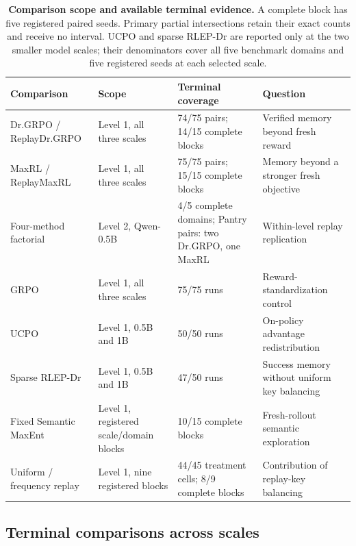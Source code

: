 \documentclass{article}
\newcommand{\1}{\mathbf 1}
\theoremstyle{remark}
\theoremstyle{definition}
\theoremstyle{plain}
\begin{document}
\begin{table}[H]
  \centering
  \caption{\textbf{Comparison scope and available terminal evidence.}
  A complete block has five registered paired seeds. Primary partial
  intersections retain their exact counts and receive no interval.
  UCPO and sparse RLEP-Dr are reported only at the two smaller model scales;
  their denominators cover all five benchmark domains and five registered
  seeds at each selected scale.}
  \label{tab:experiment-map}
  \label{tab:direct-comparators}
  \scriptsize
  \setlength{\tabcolsep}{3pt}
  \begin{tabularx}{\linewidth}{@{}P{.24\linewidth}P{.20\linewidth}P{.22\linewidth}Y@{}}
    \toprule
    \textbf{Comparison} & \textbf{Scope} & \textbf{Terminal coverage}
      & \textbf{Question} \\
    \midrule
    Dr.GRPO / ReplayDr.GRPO & Level 1, all three scales &
      74/75 pairs; 14/15 complete blocks & Verified memory beyond fresh reward \\
    MaxRL / ReplayMaxRL & Level 1, all three scales &
      75/75 pairs; 15/15 complete blocks & Memory beyond a stronger fresh objective \\
    Four-method factorial & Level 2, Qwen-0.5B &
      4/5 complete domains; Pantry pairs: two Dr.GRPO, one MaxRL & Within-level replay replication \\
    GRPO & Level 1, all three scales &
      75/75 runs & Reward-standardization control \\
    UCPO & Level 1, 0.5B and 1B &
      50/50 runs & On-policy advantage redistribution \\
    Sparse RLEP-Dr & Level 1, 0.5B and 1B &
      47/50 runs & Success memory without uniform key balancing \\
    Fixed Semantic MaxEnt & Level 1, registered scale/domain blocks &
      10/15 complete blocks & Fresh-rollout semantic exploration \\
    Uniform / frequency replay & Level 1, nine registered blocks &
      44/45 treatment cells; 8/9 complete blocks & Contribution of replay-key balancing \\
    \bottomrule
  \end{tabularx}
\end{table}





\subsection{Terminal comparisons across scales}
\label{app:scale-matrix}
\label{app:scale-snapshot}
\label{app:maxrl-scale-extensions}
\label{app:current-campaign-results}
\end{document}
